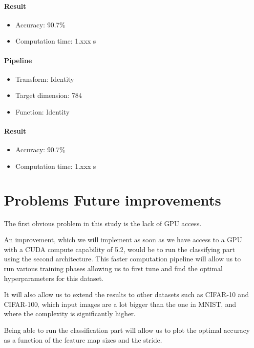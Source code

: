\documentclass[11pt,a4paper]{article}
\begin{document}
		\paragraph{Result}
		\begin{itemize}
			\item Accuracy: 90.7\%
			\item Computation time: 1.xxx s
		\end{itemize}
		
		
		
		
			\paragraph{Pipeline}
			\begin{itemize}
				\item Transform: Identity
				\item Target dimension: 784
				\item Function: Identity
			\end{itemize}
			\paragraph{Result}
			\begin{itemize}
				\item Accuracy: 90.7\%
				\item Computation time: 1.xxx s
			\end{itemize}


	
	
	\section{Problems Future improvements}
	The first obvious problem in this study is the lack of GPU access.
	
	
	An improvement, which we will implement as soon as we have access to a GPU with a CUDA compute capability of 5.2, would be to run the classifying part using the second architecture.
	This faster computation pipeline will allow us to run various training phases allowing us to first tune and find the optimal hyperparameters for this dataset.
	
	
	It will also allow us to extend the results to other datasets such as CIFAR-10 and CIFAR-100, which input images are a lot bigger than the one in MNIST, and where the complexity is significantly higher.
	
	
	Being able to run the classification part will allow us to plot the optimal accuracy as a function of the feature map sizes and the stride.
	
\end{document}
